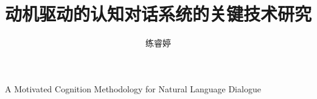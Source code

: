 \author{练睿婷}
\title{动机驱动的认知对话系统的关键技术研究}
{A Motivated Cognition Methodology for Natural Language Dialogue}
\chairman{        }
\grantdate{  }{  }
\appraiser{       }

\team{   }
\fundteam{   }
